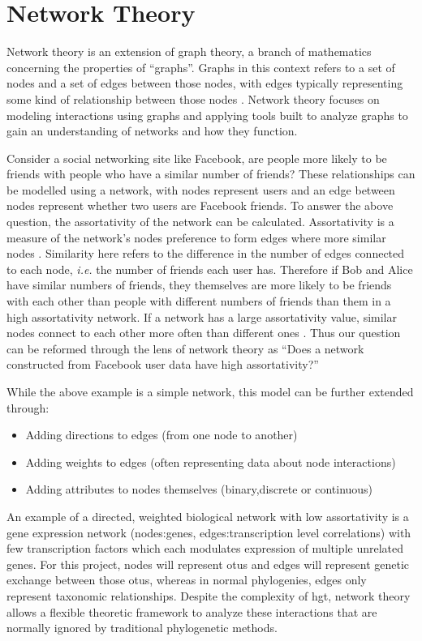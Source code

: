 \section{Network Theory}
Network theory is an extension of graph theory, a branch of mathematics concerning the properties of ``graphs''.
Graphs in this context refers to a set of nodes and a set of edges between those nodes, with edges typically representing some kind of relationship between those nodes \citep{netgen}.
Network theory focuses on modeling interactions using graphs and applying tools built to analyze graphs to gain an understanding of networks and how they function.\par
Consider a social networking site like Facebook, are people more likely to be friends with people who have a similar number of friends?
These relationships can be modelled using a network, with nodes represent users and an edge between nodes represent whether two users are Facebook friends.
To answer the above question, the assortativity of the network can be calculated.
Assortativity is a measure of the network's nodes preference to form edges where more similar nodes \citep{netgen}.
Similarity here refers to the difference in the number of edges connected to each node, \textit{i.e.} the number of friends each user has.
Therefore if Bob and Alice have similar numbers of friends, they themselves are more likely to be friends with each other than people with different numbers of friends than them in a high assortativity network.
If a network has a large assortativity value, similar nodes connect to each other more often than different ones \citep{netgen}.
Thus our question can be reformed through the lens of network theory as ``Does a network constructed from Facebook user data have high assortativity?''
\begin{center}
\end{center}
While the above example is a simple network, this model can be further extended through:
\begin{itemize}
    \item Adding directions to edges (from one node to another)
    \item Adding weights to edges (often representing data about node interactions)
    \item Adding attributes to nodes themselves (binary,discrete or continuous)
\end{itemize}
An example of a directed, weighted biological network with low assortativity is a gene expression network (nodes:genes, edges:transcription level correlations) with few transcription factors which each modulates expression of multiple unrelated genes.
For this project, nodes will represent \ac{otu}s and edges will represent genetic exchange between those \ac{otu}s, whereas in normal phylogenies, edges only represent taxonomic relationships.
Despite the complexity of \ac{hgt}, network theory allows a flexible theoretic framework to analyze these interactions that are normally ignored by traditional phylogenetic methods.

